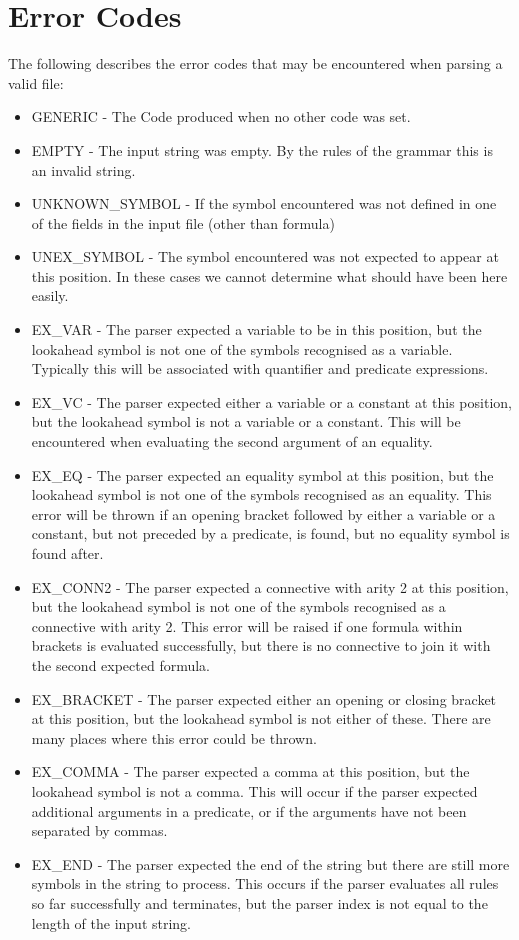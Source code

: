 \documentclass[11pt,a4paper]{article}
\begin{document}
\section{Error Codes}
The following describes the error codes that may be encountered when parsing a valid file:
\begin{itemize}
    \item GENERIC - The Code produced when no other code was set.
    \item EMPTY - The input string was empty. By the rules of the grammar this is an invalid string.
    \item UNKNOWN\_SYMBOL - If the symbol encountered was not defined in one of the fields in the input file (other than formula)
    \item UNEX\_SYMBOL - The symbol encountered was not expected to appear at this position. In these cases we cannot determine what should have been here easily.
    \item EX\_VAR - The parser expected a variable to be in this position, but the lookahead symbol is not one of the symbols recognised as a variable. Typically this will be associated with quantifier and predicate expressions.
    \item EX\_VC - The parser expected either a variable or a constant at this position, but the lookahead symbol is not a variable or a constant. This will be encountered when evaluating the second argument of an equality.
    \item EX\_EQ - The parser expected an equality symbol at this position, but the lookahead symbol is not one of the symbols recognised as an equality. This error will be thrown if an opening bracket followed by either a variable or a constant, but not preceded by a predicate, is found, but no equality symbol is found after.
    \item EX\_CONN2 - The parser expected a connective with arity 2 at this position, but the lookahead symbol is not one of the symbols recognised as a connective with arity 2. This error will be raised if one formula within brackets is evaluated successfully, but there is no connective to join it with the second expected formula.
    \item EX\_BRACKET - The parser expected either an opening or closing bracket at this position, but the lookahead symbol is not either of these. There are many places where this error could be thrown.
    \item EX\_COMMA - The parser expected a comma at this position, but the lookahead symbol is not a comma. This will occur if the parser expected additional arguments in a predicate, or if the arguments have not been separated by commas.
    \item EX\_END - The parser expected the end of the string but there are still more symbols in the string to process. This occurs if the parser evaluates all rules so far successfully and terminates, but the parser index is not equal to the length of the input string.
\end{itemize}
\end{document}

